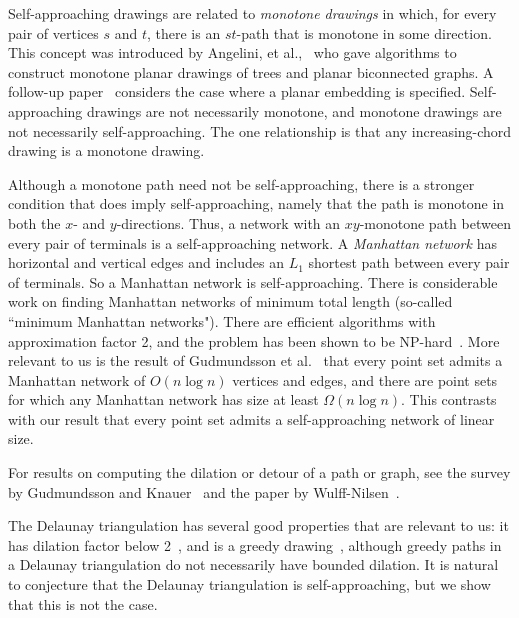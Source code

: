 \documentclass[11pt]{article}
\newcommand{\changed}[1]{#1}
\begin{document}
Self-approaching drawings are related to \emph{monotone drawings} in which, for every pair of vertices $s$ and $t$,  there is an $st$-path that is monotone in some direction.  This concept was introduced by Angelini, et al.,~\cite{Angelini:MonoDraw:2012} who
gave algorithms to construct monotone planar drawings of trees and planar biconnected graphs.   A follow-up paper~\cite{Angelini:MonoFixed:2011} considers the case where a planar embedding is specified.  Self-approaching drawings are not necessarily monotone, and monotone drawings are not necessarily self-approaching.   The one relationship is that any increasing-chord drawing is  a monotone drawing.




Although a monotone path need not be self-approaching, there is a stronger condition that does imply self-approaching, namely that
the path is monotone in both the $x$- and $y$-directions.
Thus, a network with an $xy$-monotone path between every pair of terminals is a self-approaching network.  A \emph{Manhattan network} has horizontal and vertical edges and includes an $L_1$ shortest path between every pair of terminals.   So a Manhattan network is self-approaching.
There is considerable work on finding Manhattan networks of minimum total length (so-called ``minimum Manhattan networks").  There are efficient algorithms with approximation factor 2, and the problem has been shown to be NP-hard~\cite{Chin:MMN-NP-complete:2011}.
More relevant to us is the result of Gudmundsson et al.~\cite{Gudmundsson:smallManhattan:2007} that every point set admits a Manhattan network of $O(n \log n)$ vertices and edges, and there are point sets for which any Manhattan network has size at least $\Omega(n \log n)$.
{\changed This contrasts with our result that every point set admits a self-approaching network of linear size.}

For results on computing the dilation or detour of a path or graph, see the survey by
 Gudmundsson and Knauer~\cite{Gudmundsson:Dilation:2007} and the paper by Wulff-Nilsen~\cite{Wulff-Nilsen:Detour:2010}.

The Delaunay triangulation has several good properties that are relevant to us: it has dilation factor below 2~\cite{Xia:Delaunay:2011}, and is a greedy drawing~\cite{Bose:routing:2004}, although greedy paths in a Delaunay triangulation do not necessarily have bounded dilation.
It is natural to conjecture that the Delaunay triangulation is self-approaching, but we show that this is not the case.
\end{document}
